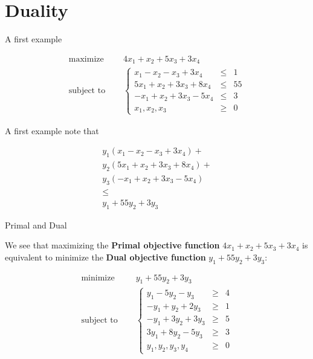 \documentclass[c]{beamer}
\begin{document}
\section{Duality}
\begin{frame}{A first example}

  \begin{equation*}
    \begin{aligned}
      \text{maximize  } \quad & 4x_1 + x_2 +5x_3 +3x_4 \\
      \text{subject to }\quad &
      \left\{
      \begin{array}{rcl}
        x_1 - x_2 -x_3 +3x_4 &\leq &1 \\
        5x_1 + x_2 +3x_3 +8x_4 &\leq &55 \\
        -x_1 + x_2 +3x_3 -5x_4 &\leq &3 \\
        x_1,x_2,x_3 &\geq& 0
      \end{array}
      \right.
    \end{aligned}
  \end{equation*}

\end{frame}
  \begin{frame}{A first example}
note that

\begin{eqnarray*}
  y_1(x_1 - x_2 -x_3 +3x_4)+\\y_2(5x_1 + x_2 +3x_3 +8x_4)+\\y_3(-x_1 + x_2 +3x_3 -5x_4) \\ \leq \\y_1+55y_2+3y_3
\end{eqnarray*}

\end{frame}
\begin{frame}{Primal and Dual}

We see that maximizing the {\bf Primal objective function} $4x_1 + x_2 +5x_3 +3x_4$ is
  equivalent to minimize the {\bf Dual objective function} $y_1+55y_2+3y_3$:

    \begin{equation*}
    \begin{aligned}
      \text{minimize } \quad & y_1+55y_2+3y_3 \\
      \text{subject to }\quad &
      \left\{
      \begin{array}{rcl}
        y_1 - 5y_2 -y_3 &\geq &4 \\
        -y_1 +y_2 +2y_3 &\geq &1 \\
        -y_1 +3y_2 +3y_3 &\geq &5 \\
        3y_1 +8y_2 -5y_3 &\geq &3 \\
        y_1,y_2,y_3,y_4 &\geq& 0
      \end{array}
      \right.
    \end{aligned}
  \end{equation*}

  \end{frame}
\end{document}
